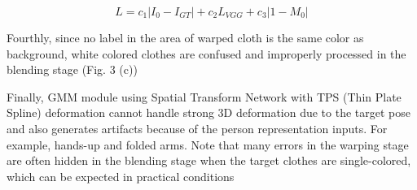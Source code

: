 \begin{equation}
L = c_1 | I_0-I_{GT} |+  c_2 L_{VGG}+c_3 |1-M_0 |        
\end{equation} 

Fourthly, since no label in the area of warped cloth is the same color as background, white colored clothes are confused and improperly processed in the blending stage (Fig. 3 (c))


Finally, GMM module using Spatial Transform Network\cite{JaderbergSZK15} with TPS (Thin Plate Spline)\cite{Bookstein1989PrincipalWT} deformation cannot handle strong 3D deformation due to the target pose and also generates artifacts because of the person representation inputs. For example, hands-up and folded arms.  Note that many errors in the warping stage are often hidden in the blending stage when the target clothes are single-colored, which can be expected in practical conditions 




